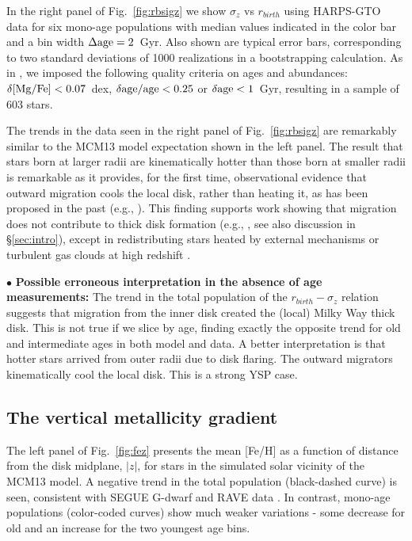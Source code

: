 \documentclass[usenatbib]{mnras}
\begin{document}
In the right panel of Fig.~\ref{fig:rbsigz} we show $\sigma_z$ vs $r_{birth}$ using HARPS-GTO data for six mono-age populations with median values indicated in the color bar and a bin width $\rm \Delta age=2$~Gyr. Also shown are typical error bars, corresponding to two standard deviations of 1000 realizations in a bootstrapping calculation. As in \cite{minchev18}, we imposed the following quality criteria on ages and abundances: $\rm\delta[Mg/Fe]<0.07$~dex, $\rm\delta age/age<0.25$ or $\rm\delta age<1$~Gyr, resulting in a sample of 603 stars.

The trends in the data seen in the right panel of Fig.~\ref{fig:rbsigz} are remarkably similar to the MCM13 model expectation shown in the left panel. The result that stars born at larger radii are kinematically hotter than those born at smaller radii is remarkable as it provides, for the first time, observational evidence that outward migration cools the local disk, rather than heating it, as has been proposed in the past (e.g., \citealt{schonrich09b, roskar13}). This finding supports work showing that migration does not contribute to thick disk formation (e.g., \citealt{minchev12b, mcm14, vera-ciro14, grand16}, see also discussion in \S\ref{sec:intro}), except in redistributing stars heated by external mechanisms \citep{quinn93, villalobos08} or turbulent gas clouds at high redshift \citep{bournaud09,forbes12}.

$\bullet$ {\bf Possible erroneous interpretation in the absence of age measurements:} The trend in the total population of the $r_{birth}-\sigma_z$ relation suggests that migration from the inner disk created the (local) Milky Way thick disk. This is not true if we slice by age, finding exactly the opposite trend for old and intermediate ages in both model and data. A better interpretation is that hotter stars arrived from outer radii due to disk flaring. The outward migrators kinematically cool the local disk. This is a strong YSP case.


\subsection{The vertical metallicity gradient}
\label{sec:fez}

The left panel of Fig.~\ref{fig:fez} presents the mean [Fe/H] as a function of distance from the disk midplane, $|z|$, for stars in the simulated solar vicinity of the MCM13 model. A negative trend in the total population (black-dashed curve) is seen, consistent with SEGUE G-dwarf \citep{schlesinger12, rix13} and RAVE data \citep{boeche13b}. In contrast, mono-age populations (color-coded curves) show much weaker variations - some decrease for old and an increase for the two youngest age bins. 
\end{document}
